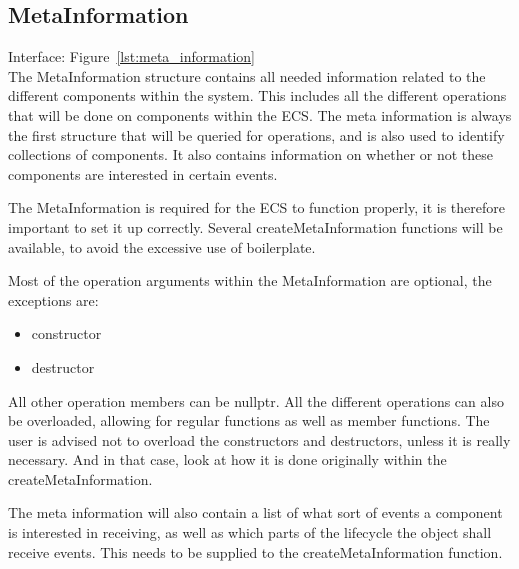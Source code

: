 \subsection{MetaInformation}
Interface: Figure~\ref{lst:meta_information}\\\noindent
The MetaInformation structure contains all needed information related to the different components within the system.
This includes all the different operations that will be done on components within the ECS.
The meta information is always the first structure that will be queried for operations, and is also used to identify collections of components.
It also contains information on whether or not these components are interested in certain events. 

The MetaInformation is required for the ECS to function properly, it is therefore important to set it up correctly.
Several createMetaInformation functions will be available, to avoid the excessive use of boilerplate.

Most of the operation arguments within the MetaInformation are optional, the exceptions are:
\begin{itemize}
    \item constructor
    \item destructor
\end{itemize}
All other operation members can be nullptr. All the different operations can also be overloaded, 
allowing for regular functions as well as member functions.
The user is advised not to overload the constructors and destructors, unless it is really necessary.
And in that case, look at how it is done originally within the createMetaInformation.

The meta information will also contain a list of what sort of events a component is interested in receiving, 
as well as which parts of the lifecycle the object shall receive events.
This needs to be supplied to the createMetaInformation function.
